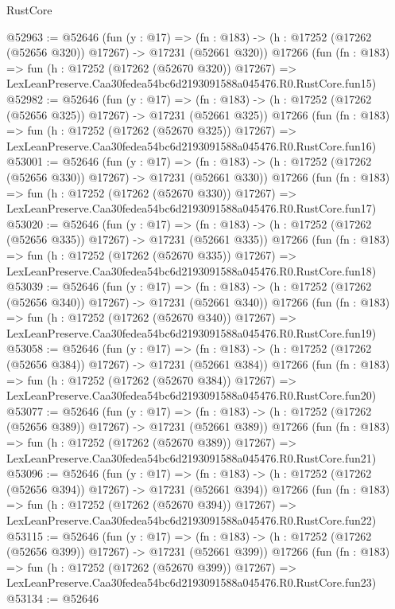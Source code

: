 \begin{lexlean}{RustCore}
\begin{coremodule}
@52963 := @52646
    (fun (y : @17) =>
    (fn : @183) -> (h : @17252 (@17262 (@52656 @320)) @17267) -> @17231 (@52661 @320))
    @17266
    (fun (fn : @183) =>
    fun (h : @17252 (@17262 (@52670 @320)) @17267) =>
    LexLeanPreserve.Caa30fedea54bc6d2193091588a045476.R0.RustCore.fun15)
@52982 := @52646
    (fun (y : @17) =>
    (fn : @183) -> (h : @17252 (@17262 (@52656 @325)) @17267) -> @17231 (@52661 @325))
    @17266
    (fun (fn : @183) =>
    fun (h : @17252 (@17262 (@52670 @325)) @17267) =>
    LexLeanPreserve.Caa30fedea54bc6d2193091588a045476.R0.RustCore.fun16)
@53001 := @52646
    (fun (y : @17) =>
    (fn : @183) -> (h : @17252 (@17262 (@52656 @330)) @17267) -> @17231 (@52661 @330))
    @17266
    (fun (fn : @183) =>
    fun (h : @17252 (@17262 (@52670 @330)) @17267) =>
    LexLeanPreserve.Caa30fedea54bc6d2193091588a045476.R0.RustCore.fun17)
@53020 := @52646
    (fun (y : @17) =>
    (fn : @183) -> (h : @17252 (@17262 (@52656 @335)) @17267) -> @17231 (@52661 @335))
    @17266
    (fun (fn : @183) =>
    fun (h : @17252 (@17262 (@52670 @335)) @17267) =>
    LexLeanPreserve.Caa30fedea54bc6d2193091588a045476.R0.RustCore.fun18)
@53039 := @52646
    (fun (y : @17) =>
    (fn : @183) -> (h : @17252 (@17262 (@52656 @340)) @17267) -> @17231 (@52661 @340))
    @17266
    (fun (fn : @183) =>
    fun (h : @17252 (@17262 (@52670 @340)) @17267) =>
    LexLeanPreserve.Caa30fedea54bc6d2193091588a045476.R0.RustCore.fun19)
@53058 := @52646
    (fun (y : @17) =>
    (fn : @183) -> (h : @17252 (@17262 (@52656 @384)) @17267) -> @17231 (@52661 @384))
    @17266
    (fun (fn : @183) =>
    fun (h : @17252 (@17262 (@52670 @384)) @17267) =>
    LexLeanPreserve.Caa30fedea54bc6d2193091588a045476.R0.RustCore.fun20)
@53077 := @52646
    (fun (y : @17) =>
    (fn : @183) -> (h : @17252 (@17262 (@52656 @389)) @17267) -> @17231 (@52661 @389))
    @17266
    (fun (fn : @183) =>
    fun (h : @17252 (@17262 (@52670 @389)) @17267) =>
    LexLeanPreserve.Caa30fedea54bc6d2193091588a045476.R0.RustCore.fun21)
@53096 := @52646
    (fun (y : @17) =>
    (fn : @183) -> (h : @17252 (@17262 (@52656 @394)) @17267) -> @17231 (@52661 @394))
    @17266
    (fun (fn : @183) =>
    fun (h : @17252 (@17262 (@52670 @394)) @17267) =>
    LexLeanPreserve.Caa30fedea54bc6d2193091588a045476.R0.RustCore.fun22)
@53115 := @52646
    (fun (y : @17) =>
    (fn : @183) -> (h : @17252 (@17262 (@52656 @399)) @17267) -> @17231 (@52661 @399))
    @17266
    (fun (fn : @183) =>
    fun (h : @17252 (@17262 (@52670 @399)) @17267) =>
    LexLeanPreserve.Caa30fedea54bc6d2193091588a045476.R0.RustCore.fun23)
@53134 := @52646

\end{coremodule}
\end{lexlean}
